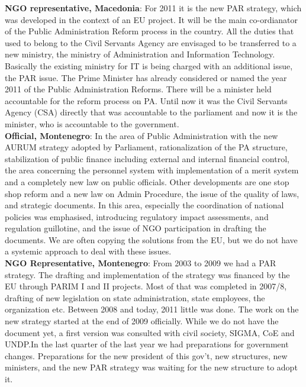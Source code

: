 \textbf{NGO representative, Macedonia}: For 2011 it is the new PAR strategy, which was developed in the context of an EU project. It will be the main co-ordianator of the Public Administration Reform process in the country. All the duties that used to belong to the Civil Servants Agency are envisaged to be transferred to a new ministry, the ministry of Administration and Information Technology. Basically the existing ministry for IT is being charged with an additional issue, the PAR issue. The Prime Minister has already considered or named the year 2011 of the Public Administration Reforms. There will be a minister held accountable for the reform process on PA. Until now it was the Civil Servants Agency (CSA) directly that was accountable to the parliament and now it is the minister, who is accountable to the government.\\
\textbf{Official, Montenegro}: In the area of Public Administration with the new AURUM strategy adopted by Parliament, rationalization of the PA structure, stabilization of public finance including external and internal financial control, the area concerning the personnel system with implementation of a merit system and a completely new law on public officials. Other developments are one stop shop reform and a new law on Admin Procedure, the issue of the quality of laws, and strategic documents. In this area, especially the coordination of national policies was emphasised, introducing regulatory impact assessments, and regulation guillotine, and the issue of NGO participation in drafting the documents. We are often copying the solutions from the EU, but we do not have a systemic approach to deal with these issues.\\
\textbf{NGO Representative, Montenegro}: From 2003 to 2009 we had a PAR strategy. The drafting and implementation of the strategy was financed by the EU through PARIM I and II projects. Most of that was completed in 2007/8, drafting of new legislation on state administration, state employees, the organization etc. Between 2008 and today, 2011 little was done. The work on the new strategy started at the end of 2009 officially. While we do not have the document yet, a first version was consulted with civil society, SIGMA, CoE and UNDP.In the last quarter of the last year we had preparations for government changes. Preparations for the new president of this gov't, new structures, new ministers, and the new PAR strategy was waiting for the new structure to adopt it.%
